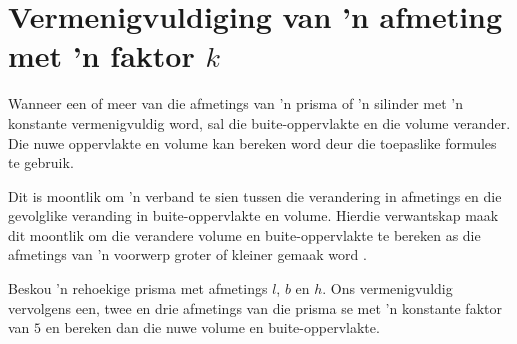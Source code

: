 \section{Vermenigvuldiging van 'n afmeting met 'n faktor $k$}
Wanneer een of meer van die afmetings van 'n prisma of 'n silinder met 'n konstante vermenigvuldig word, sal die buite-oppervlakte en die volume verander. 
Die nuwe oppervlakte en volume kan bereken word deur die toepaslike formules te gebruik.
\par
Dit is moontlik om 'n verband te sien tussen die verandering in afmetings en die gevolglike veranding in buite-oppervlakte en volume. Hierdie verwantskap maak dit moontlik om die verandere volume en buite-oppervlakte te bereken as die afmetings van 'n voorwerp groter of kleiner gemaak word .\par
{}
Beskou 'n rehoekige prisma met afmetings $l$, $b$ en $h$. Ons vermenigvuldig vervolgens een, twee en drie afmetings van die prisma se met 'n konstante faktor van $5$ en bereken dan die nuwe volume en buite-oppervlakte.\par
